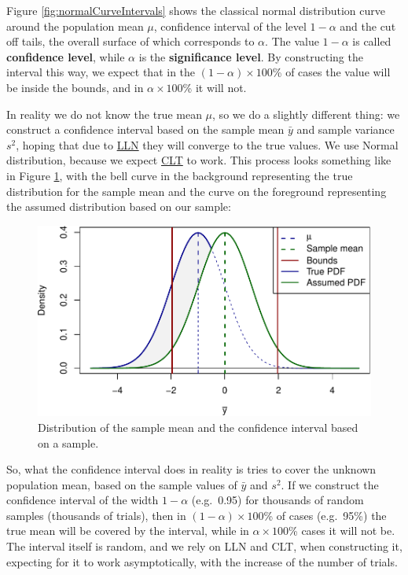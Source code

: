 \documentclass[
]{book}
\theoremstyle{definition}
\theoremstyle{definition}
\theoremstyle{definition}
\theoremstyle{definition}
\theoremstyle{remark}
\begin{document}
Figure \ref{fig:normalCurveIntervals} shows the classical normal distribution curve around the population mean \(\mu\), confidence interval of the level \(1-\alpha\) and the cut off tails, the overall surface of which corresponds to \(\alpha\). The value \(1-\alpha\) is called \textbf{confidence level}, while \(\alpha\) is the \textbf{significance level}. By constructing the interval this way, we expect that in the \((1-\alpha)\times 100\)\% of cases the value will be inside the bounds, and in \(\alpha\times 100\)\% it will not.

In reality we do not know the true mean \(\mu\), so we do a slightly different thing: we construct a confidence interval based on the sample mean \(\bar{y}\) and sample variance \(s^2\), hoping that due to \protect\hyperlink{LLNandCLT}{LLN} they will converge to the true values. We use Normal distribution, because we expect \protect\hyperlink{LLNandCLT}{CLT} to work. This process looks something like in Figure \ref{fig:normalCurveIntervalsShades}, with the bell curve in the background representing the true distribution for the sample mean and the curve on the foreground representing the assumed distribution based on our sample:

\begin{figure}
\centering
\includegraphics{Svetunkov---Statistics-for-Business-Analytics_files/figure-latex/normalCurveIntervalsShades-1.pdf}
\caption{\label{fig:normalCurveIntervalsShades}Distribution of the sample mean and the confidence interval based on a sample.}
\end{figure}

So, what the confidence interval does in reality is tries to cover the unknown population mean, based on the sample values of \(\bar{y}\) and \(s^2\). If we construct the confidence interval of the width \(1-\alpha\) (e.g.~0.95) for thousands of random samples (thousands of trials), then in \((1-\alpha)\times 100\)\% of cases (e.g.~95\%) the true mean will be covered by the interval, while in \(\alpha \times 100\)\% cases it will not be. The interval itself is random, and we rely on LLN and CLT, when constructing it, expecting for it to work asymptotically, with the increase of the number of trials.
\end{document}

